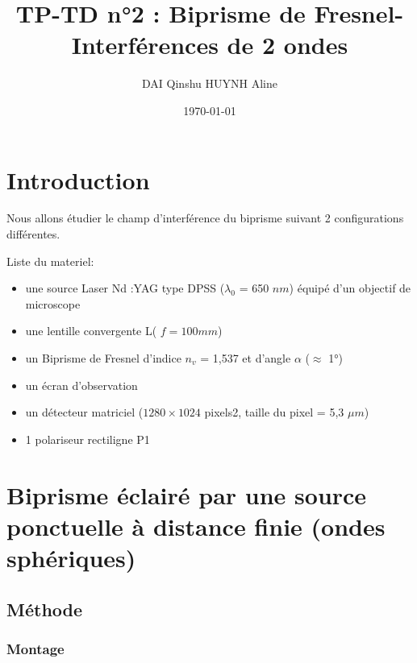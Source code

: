\documentclass[11pt, a4paper]{article}
\title{\textbf{TP-TD n°2 : Biprisme de Fresnel- Interférences de 2 ondes}}
\author{DAI Qinshu HUYNH Aline}
\date{\today}
\begin{document}
\maketitle
\thispagestyle{fancy}

\tableofcontents
\newpage

\section{Introduction}
Nous allons étudier le champ d’interférence du biprisme suivant 2 configurations différentes.

\bigskip

Liste du materiel:
\begin{itemize}
    \item une source Laser Nd :YAG type DPSS ($\lambda_{0}$ = 650 $n m$) équipé d’un objectif de microscope
    \item une lentille convergente L( $f = 100 mm$) 
    \item un Biprisme de Fresnel d'indice $n_{v}$ = 1,537 et d'angle $\alpha$ ($\approx$ 1°)
    \item un écran d'observation
    \item un détecteur matriciel ($1280\times1024$ pixels2, taille du pixel = 5,3 $\mu m$)
    \item 1 polariseur rectiligne P1

\end{itemize}

\section{Biprisme éclairé par une source ponctuelle à distance finie
    (ondes sphériques)}
\subsection{Méthode}
    \subsubsection{Montage}
\end{document}
